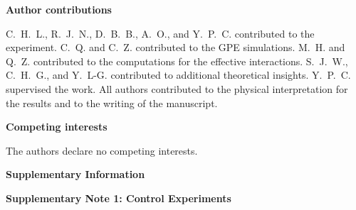 \documentclass[showpacs,preprintnumbers,amsmath,amssymb, superscriptaddress, aps, reprint]{revtex4-1}
\renewcommand{\figurename}{Figure}
\begin{document}
{{{\vspace{5mm}
\centerline{\textbf{Author contributions}}
C.~H.~L., R.~J.~N., D.~B.~B., A.~O., and Y.~P.~C. contributed to the experiment. C.~Q. and C.~Z. contributed to the GPE simulations. 
M.~H. and Q.~Z. contributed to the computations for the effective interactions. 
S.~J.~W., C.~H.~G., and Y.~L-G. contributed to additional theoretical insights.  
Y.~P.~C. supervised the work.   
All authors contributed to the physical interpretation for the results and to the writing of the manuscript.

\vspace{5mm}
\centerline{\textbf{Competing interests}}
The authors declare no competing interests.


}







\onecolumngrid

\setcounter{figure}{0}
\setcounter{table}{0}
\makeatletter
\renewcommand{\figurename}{Supplementary Figure}
\renewcommand\tablename{Supplementary Table}
\renewcommand{\thetable}{\arabic{table}}

\newpage
\begin{center}
\large{\textbf{Supplementary Information}}
\end{center}

\begin{center}
\textbf{Supplementary Note 1: Control Experiments}
\end{center}

}}
\end{document}
